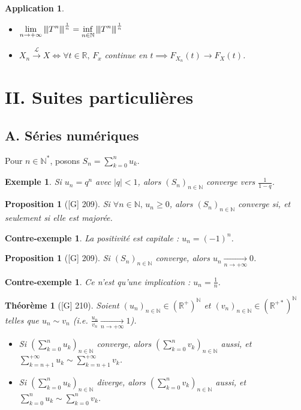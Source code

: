 \documentclass[10pt, a4paper, parskip=full, twoside, twocolumn]{report}
\newtheorem{theorem}[definition]{Théorème}
\newtheorem{proposition}[definition]{Proposition}
\newtheorem{example}[definition]{Exemple}
\newtheorem{cexample}[definition]{Contre-exemple}
\newtheorem{application}[definition]{Application}
\newcommand{\IN}{\mathbb{N}}
\newcommand{\IR}{\mathbb{R}}
\newcommand{\vertiii}[1]{{\left\vert\kern-0.25ex\left\vert\kern-0.25ex\left\vert #1 
    \right\vert\kern-0.25ex\right\vert\kern-0.25ex\right\vert}}
\begin{document}
\begin{application}
	\begin{itemize}
		\item $\displaystyle{\lim_{n\to +\infty} \vertiii{T^n}^{\frac{1}{n}} = \inf_{n\in\IN} \vertiii{T^n}^{\frac{1}{n}}}$
		\item $X_n \xrightarrow{\mathcal{L}} X \iff \forall t\in\IR,\, F_x$ continue en $t\implies F_{X_n}(t)\to F_X(t)$.
	\end{itemize}
\end{application}

\section*{II. Suites particulières}
\subsection*{A. Séries numériques}
\textcolor{paragraphtext}{Pour $n\in\IN^*$, posons $S_n = \sum_{k=0}^{n} u_k$.}

\begin{example}
	Si $u_n = q^n$ avec $\vert q\vert < 1$, alors $\left(S_n\right)_{n\in\IN}$ converge vers $\frac{1}{1-q}$.
\end{example}

\begin{proposition}[\textnormal{[G] 209}]
	Si $\forall n\in\IN,\, u_n\geq 0$, alors $\left(S_n\right)_{n\in\IN}$ converge si, et seulement si elle est majorée.
\end{proposition}

\begin{cexample}
	La positivité est capitale : $u_n = (-1)^n$.
\end{cexample}

\begin{proposition}[\textnormal{[G] 209}]
	Si $\left(S_n\right)_{n\in\IN}$ converge, alors $\displaystyle{u_n\xrightarrow[n\to +\infty]{} 0}$.
\end{proposition}

\begin{cexample}
	Ce n'est qu'une implication : $u_n = \frac{1}{n}$.
\end{cexample}

\begin{theorem}[\textnormal{[G] 210}]
	Soient $\left(u_n\right)_{n\in\IN}\in\left(\IR^+\right)^{\IN}$ et $\left(v_n\right)_{n\in\IN}\in\left(\IR^{+*}\right)^{\IN}$ telles que $u_n\sim v_n$ (\emph{i.e.} $\frac{u_n}{v_n}\xrightarrow[n\to +\infty]{} 1$).
	\begin{itemize}
		\item Si $\left(\sum_{k=0}^{n}u_k\right)_{n\in\IN}$ converge, alors $\left(\sum_{k=0}^{n}v_k\right)_{n\in\IN}$ aussi, et $\sum_{k=n+1}^{+\infty}u_k\sim \sum_{k=n+1}^{+\infty}v_k$.
		\item Si $\left(\sum_{k=0}^{n}u_k\right)_{n\in\IN}$ diverge, alors $\left(\sum_{k=0}^{n}v_k\right)_{n\in\IN}$ aussi, et $\sum_{k=0}^{n}u_k\sim \sum_{k=0}^{n}v_k$.
	\end{itemize}
\end{theorem}
\end{document}
